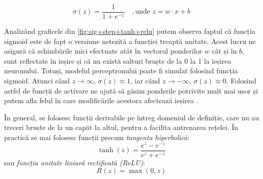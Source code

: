 \begin{equation}
\sigma(z) = \frac{1}{1+e^{-z}} \quad,\text{unde }z= w\cdot x + b
\label{eq:sigm}
\end{equation}

Analizând graficele din \autoref{fig:sig+step+tanh+relu} putem observa faptul că funcția sigmoid este de fapt o versiune netezită a funcției treaptă unitate. Acest lucru ne asigură că schimbările mici efectuate atât în vectorul ponderilor $w$ cât și în $b$, sunt reflectate în ieșire și că nu există salturi bruște de la 0 la 1 la ieșirea neuronului.
Totuși, modelul perceptronului poate fi simulat folosind funcția sigmoid. Atunci când $z\rightarrow\infty$, $\sigma(z)\approx 1$, iar când $z\rightarrow-\infty$, $\sigma(z)\approx 0$. Folosind astfel de funcții de activare ne ajută să găsim ponderile potrivite mult mai ușor și putem afla felul în care modificările acestora afectează ieșirea \cite{neuralnetbook:2015}.

În general, se folosesc funcții derivabile pe întreg domeniul de definiție, care nu au treceri bruște de la un capăt la altul, pentru a facilita antrenarea rețelei. În practică se mai folosesc funcții precum \textit{tangenta hiperbolică}:
\begin{equation}
\tanh(z)=\frac{e^z - e^{-z}}{e^z + e^{-z}}
\end{equation}
sau \textit{funcția unitate liniară rectificată (ReLU)}:
\begin{equation}
R(z)=\max(0,z)
\label{eq:relu}
\end{equation}

